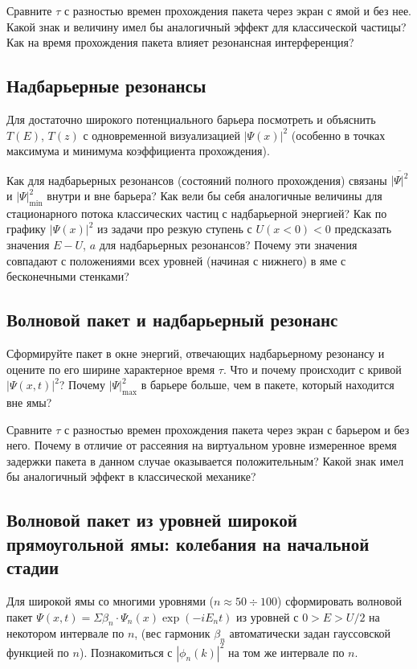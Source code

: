 \documentclass[12pt]{article}
\begin{document}
Сравните $\tau$ с разностью времен прохождения пакета через экран с ямой и без нее. Какой знак и величину имел бы аналогичный эффект для классической частицы? Как на время  прохождения пакета влияет резонансная интерференция?

\hypertarget{barrier}{}\subsection{Надбарьерные резонансы}
Для достаточно широкого потенциального барьера посмотреть
и объяснить $T(E)$, $T(z)$ с одновременной визуализацией $|\Psi
(x)|^2$ (особенно в точках максимума и минимума коэффициента
прохождения).

Как для надбарьерных резонансов (состояний полного прохождения) связаны $\overline{|\Psi|^2}$ и $|\Psi|^2_{\min}$ внутри и вне барьера? Как вели бы себя аналогичные величины для стационарного потока классических частиц с надбарьерной энергией? Как по графику $|\Psi(x)|^2$ из задачи про резкую ступень с $U(x<0)<0$ предсказать  значения $E-U$, $a$ для надбарьерных резонансов? Почему эти значения совпадают с положениями всех уровней (начиная с нижнего) в яме с бесконечными стенками?

\hypertarget{WP_overbarrier}{}\subsection{Волновой пакет и
надбарьерный резонанс}
Сформируйте пакет в окне энергий, отвечающих надбарьерному  резонансу и оцените по его ширине характерное время $\tau$. Что и почему  происходит с кривой $|\Psi (x,t)|^2$?
Почему $|\Psi|_{\max}^2$ в барьере больше, чем в пакете, который находится вне  ямы?

Сравните $\tau$ с разностью времен прохождения пакета через экран с барьером и без него. Почему в отличие от рассеяния на виртуальном уровне измеренное время задержки пакета в данном случае оказывается положительным? Какой знак имел бы аналогичный эффект в классической механике?


\hypertarget{WP-well}{}\subsection{Волновой пакет из уровней широкой
прямоугольной ямы: колебания на начальной стадии}
Для широкой ямы со многими уровнями ($n\approx50\div100$)
сформировать волновой пакет $\Psi(x,t)=\Sigma \beta_n\cdot\Psi_n
(x)\exp(-iE_nt)$ из уровней с $0>E>U/2$ на некотором интервале по
$n$, (вес гармоник $\beta_n$ автоматически задан гауссовской
функцией по $n$). Познакомиться с $|\phi_n(k)|^2$ на том же
интервале по $n$.
\end{document}
